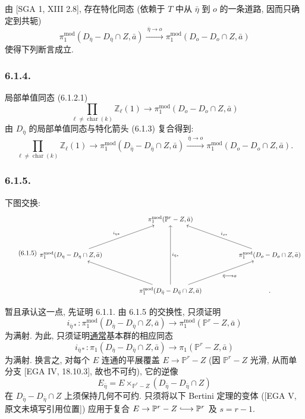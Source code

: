 由 [SGA 1, XIII 2.8], 存在特化同态 (依赖于 $T$ 中从 $\bar\eta$ 到 $o$ 的一条道路, 因而只确定到共轭)
\begin{equation}\tag{6.1.3}
\pi_1^{\mathrm{mod}}(D_{\bar\eta}-D_{\bar\eta}\cap Z,\bar a)
\xrightarrow{\ \bar\eta\longrightarrow o\ }
\pi_1^{\mathrm{mod}}(D_o-D_o\cap Z,\bar a)
\end{equation}
使得下列断言成立.

\subsubsection*{6.1.4.}
局部单值同态 (6.1.2.1)
\[
\prod_{\ell\ne\operatorname{char}(k)}\mathbb Z_\ell(1)
\longrightarrow
\pi_1^{\mathrm{mod}}(D_o-D_o\cap Z,\bar a)
\]
由 $D_{\bar\eta}$ 的局部单值同态与特化箭头 (6.1.3) 复合得到:
\begin{equation}\tag{6.1.4.1}
\prod_{\ell\ne\operatorname{char}(k)}\mathbb Z_\ell(1)
\longrightarrow
\pi_1^{\mathrm{mod}}(D_{\bar\eta}-D_{\bar\eta}\cap Z,\bar a)
\xrightarrow{\ \bar\eta\longrightarrow o\ }
\pi_1^{\mathrm{mod}}(D_o-D_o\cap Z,\bar a).
\end{equation}

\subsubsection*{6.1.5.}
下图交换:
\begin{equation}\tag{6.1.5}
\begin{tikzcd}[column sep=huge,row sep=huge]
{} & \pi_1^{\mathrm{mod}}(\mathbb P^r-Z,\bar a) & {} \\
\pi_1^{\mathrm{mod}}(D_\eta-D_\eta\cap Z,\bar a)
  \arrow[ur,"i_{\eta*}"]
& {}
& \pi_1^{\mathrm{mod}}(D_o-D_o\cap Z,\bar a)
  \arrow[ul,"i_{o*}"'] \\
{} & \pi_1^{\mathrm{mod}}(D_{\bar\eta}-D_{\bar\eta}\cap Z,\bar a)
  \arrow[uu,"i_{\bar\eta*}"']
  \arrow[ul]
  \arrow[ur,"\bar\eta\longrightarrow o"'] & {} .
\end{tikzcd}
\end{equation}

暂且承认这一点, 先证明 6.1.1. 由 6.1.5 的交换性, 只须证明
\[
i_{\bar\eta*}:
\pi_1^{\mathrm{mod}}(D_{\bar\eta}-D_{\bar\eta}\cap Z,\bar a)
\longrightarrow
\pi_1^{\mathrm{mod}}(\mathbb P^r-Z,\bar a)
\]
为满射. 为此, 只须证明\underline{通常}基本群的相应同态
\begin{equation}\tag{6.1.6}
i_{\bar\eta*}:
\pi_1(D_{\bar\eta}-D_{\bar\eta}\cap Z,\bar a)
\longrightarrow
\pi_1(\mathbb P^r-Z,\bar a)
\end{equation}
为满射. 换言之, 对每个 $E$ 连通的平展覆盖 $E\to\mathbb P^r-Z$ (因 $\mathbb P^r-Z$ 光滑, 从而单分支 [EGA IV, 18.10.3], 故也不可约), 它的逆像
\[
E_{\bar\eta}
=E\times_{\mathbb P^r-Z}(D_{\bar\eta}-D_{\bar\eta}\cap Z)
\]
在 $D_{\bar\eta}-D_{\bar\eta}\cap Z$ 上须保持几何不可约. 只须将以下 Bertini 定理的变体 ([EGA V, 原文未填写引用位置]) 应用于复合 $E\to\mathbb P^r-Z\lhook\joinrel\longrightarrow\mathbb P^r$ 及 $s=r-1$.

